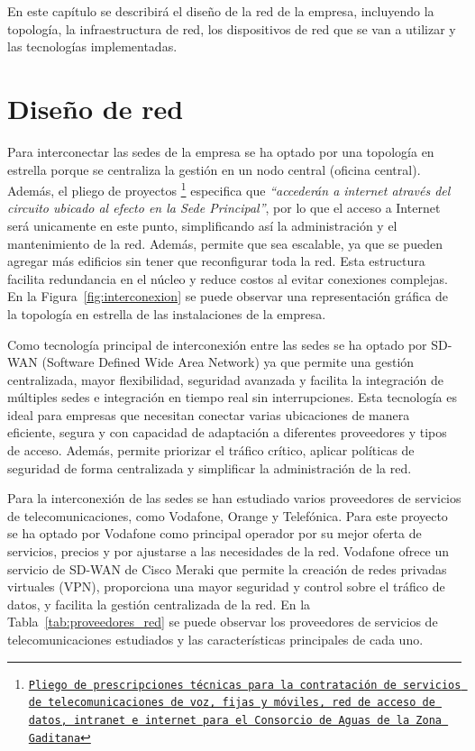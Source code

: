 En este capítulo se describirá el diseño de la red de la empresa, incluyendo la topología,
la infraestructura de red, los dispositivos de red que se van a utilizar y las tecnologías implementadas.

\section{Diseño de red}
Para interconectar las sedes de la empresa se ha optado por una topología en estrella
porque se centraliza la gestión en un nodo central (oficina central). Además, el pliego de proyectos \footnote{\href{https://contrataciondelestado.es/wps/wcm/connect/PLACE_es/Site/area/docAccCmpnt?srv=cmpnt&cmpntname=GetDocumentsById&source=library&DocumentIdParam=10e9102e-09a6-42de-810d-d08c7c77bd65}{\texttt{Pliego de prescripciones técnicas para la contratación de servicios de telecomunicaciones de voz, fijas y móviles, red de acceso de datos,
			intranet e internet para el Consorcio de Aguas de la Zona Gaditana}}} especifica que \textit{``accederán a internet através del circuito ubicado al efecto en la Sede Principal''}, por lo que el acceso a Internet será unicamente en este punto, simplificando así la administración y el mantenimiento de la red. Además, permite que sea escalable, ya que se pueden agregar más edificios sin tener que reconfigurar toda la red. Esta estructura facilita redundancia en el núcleo y reduce costos al evitar conexiones complejas. En la Figura~\ref{fig:interconexion} se puede observar una representación gráfica de la topología en estrella de las instalaciones de la empresa.

\vspace{0.5cm}
Como tecnología principal de interconexión entre las sedes se ha optado por SD-WAN (Software Defined Wide Area Network) ya que permite una gestión centralizada, mayor flexibilidad, seguridad avanzada y facilita la integración de múltiples sedes e integración en tiempo real sin interrupciones. Esta tecnología es ideal para empresas que necesitan conectar varias ubicaciones de manera eficiente, segura y con capacidad de adaptación a diferentes proveedores y tipos de acceso.
Además, permite priorizar el tráfico crítico, aplicar políticas de seguridad de forma centralizada y simplificar
la administración de la red.

\vspace{0.5cm}
Para la interconexión de las sedes se han estudiado varios proveedores de servicios de telecomunicaciones, como Vodafone, Orange y Telefónica. Para este proyecto se ha optado por Vodafone como principal operador por su mejor oferta de servicios, precios y por ajustarse a las necesidades de la red. Vodafone ofrece un servicio de SD-WAN de Cisco Meraki que permite la creación de redes privadas virtuales (VPN), proporciona una mayor seguridad y control sobre el tráfico de datos, y facilita la gestión centralizada de la red. En la Tabla~\ref{tab:proveedores_red} se puede observar los proveedores de servicios de telecomunicaciones estudiados y las características principales de cada uno.

